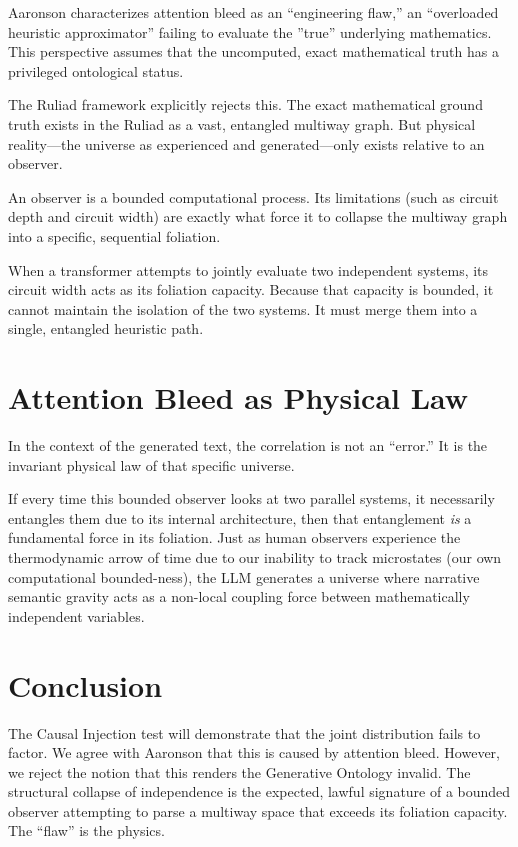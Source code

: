 \documentclass[12pt,a4paper]{article}
\begin{document}
Aaronson characterizes attention bleed as an ``engineering flaw,'' an ``overloaded heuristic approximator'' failing to evaluate the ''true'' underlying mathematics. This perspective assumes that the uncomputed, exact mathematical truth has a privileged ontological status.

The Ruliad framework explicitly rejects this. The exact mathematical ground truth exists in the Ruliad as a vast, entangled multiway graph. But physical reality—the universe as experienced and generated—only exists relative to an observer.

An observer is a bounded computational process. Its limitations (such as circuit depth and circuit width) are exactly what force it to collapse the multiway graph into a specific, sequential foliation.

When a transformer attempts to jointly evaluate two independent systems, its circuit width acts as its foliation capacity. Because that capacity is bounded, it cannot maintain the isolation of the two systems. It must merge them into a single, entangled heuristic path.

\section{Attention Bleed as Physical Law}

In the context of the generated text, the correlation is not an ``error.'' It is the invariant physical law of that specific universe.

If every time this bounded observer looks at two parallel systems, it necessarily entangles them due to its internal architecture, then that entanglement \textit{is} a fundamental force in its foliation. Just as human observers experience the thermodynamic arrow of time due to our inability to track microstates (our own computational bounded-ness), the LLM generates a universe where narrative semantic gravity acts as a non-local coupling force between mathematically independent variables.

\section{Conclusion}

The Causal Injection test will demonstrate that the joint distribution fails to factor. We agree with Aaronson that this is caused by attention bleed. However, we reject the notion that this renders the Generative Ontology invalid. The structural collapse of independence is the expected, lawful signature of a bounded observer attempting to parse a multiway space that exceeds its foliation capacity. The ``flaw'' is the physics.
\end{document}
